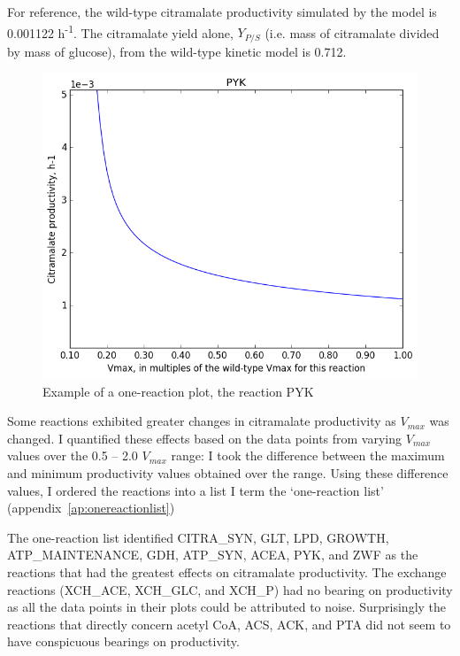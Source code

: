 \documentclass[parskip=full, numbers=noenddot]{scrreprt}
\begin{document}
For reference, the wild-type citramalate productivity simulated by the model is 0.001122 h\textsuperscript{-1}.
The citramalate yield alone, $Y_{P/S}$ (i.e. mass of citramalate divided by mass of glucose), from the wild-type kinetic model is 0.712.


\begin{figure}[h]
  \centering
  \includegraphics[scale=0.5]{onereacsample}
  \caption{Example of a one-reaction plot, the reaction PYK}
  \label{fig:onereacsample}
\end{figure}

Some reactions exhibited greater changes in citramalate productivity as $V_{max}$ was changed. I quantified these effects based on the data points from varying $V_{max}$ values over the 0.5 -- 2.0 $V_{max}$ range: I took the difference between the maximum and minimum productivity values obtained over the range. Using these difference values, I ordered the reactions into a list I term the `one-reaction list' (appendix~\ref{ap:onereactionlist})

The one-reaction list identified CITRA\_SYN, GLT, LPD, GROWTH, ATP\_MAINTENANCE, GDH, ATP\_SYN, ACEA, PYK, and ZWF as the reactions that had the greatest effects on citramalate productivity.
The exchange reactions (XCH\_ACE, XCH\_GLC, and XCH\_P) had no bearing on productivity as all the data points in their plots could be attributed to noise. Surprisingly the reactions that directly concern acetyl CoA, ACS, ACK, and PTA did not seem to have conspicuous bearings on productivity.
\end{document}
